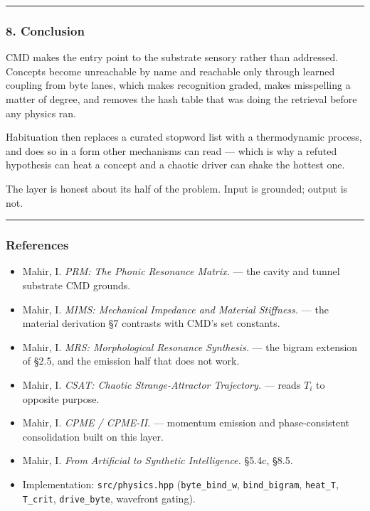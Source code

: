 \documentclass[
  11pt,
  a4paper,
]{article}
\providecommand{\tightlist}{%
  \setlength{\itemsep}{0pt}\setlength{\parskip}{0pt}}
\begin{document}
\begin{center}\rule{0.5\linewidth}{0.5pt}\end{center}

\subsubsection{8. Conclusion}\label{conclusion-1}

CMD makes the entry point to the substrate sensory rather than
addressed. Concepts become unreachable by name and reachable only
through learned coupling from byte lanes, which makes recognition
graded, makes misspelling a matter of degree, and removes the hash table
that was doing the retrieval before any physics ran.

Habituation then replaces a curated stopword list with a thermodynamic
process, and does so in a form other mechanisms can read --- which is
why a refuted hypothesis can heat a concept and a chaotic driver can
shake the hottest one.

The layer is honest about its half of the problem. Input is grounded;
output is not.

\begin{center}\rule{0.5\linewidth}{0.5pt}\end{center}

\subsubsection{References}\label{references-1}

\begin{itemize}
\tightlist
\item
  Mahir, I. \emph{PRM: The Phonic Resonance Matrix.} --- the cavity and
  tunnel substrate CMD grounds.
\item
  Mahir, I. \emph{MIMS: Mechanical Impedance and Material Stiffness.}
  --- the material derivation §7 contrasts with CMD's set constants.
\item
  Mahir, I. \emph{MRS: Morphological Resonance Synthesis.} --- the
  bigram extension of §2.5, and the emission half that does not work.
\item
  Mahir, I. \emph{CSAT: Chaotic Strange-Attractor Trajectory.} --- reads
  \(T_i\) to opposite purpose.
\item
  Mahir, I. \emph{CPME / CPME-II.} --- momentum emission and
  phase-consistent consolidation built on this layer.
\item
  Mahir, I. \emph{From Artificial to Synthetic Intelligence.} §5.4c,
  §8.5.
\item
  Implementation: \texttt{src/physics.hpp} (\texttt{byte\_bind\_w},
  \texttt{bind\_bigram}, \texttt{heat\_T}, \texttt{T\_crit},
  \texttt{drive\_byte}, wavefront gating).
\end{itemize}
\end{document}
